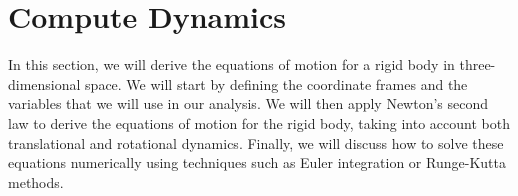 \section{Compute Dynamics}
    In this section, we will derive the equations of motion for a rigid body in three-dimensional space. We will start by defining the coordinate frames and the variables that we will use in our analysis. We will then apply Newton's second law to derive the equations of motion for the rigid body, taking into account both translational and rotational dynamics. Finally, we will discuss how to solve these equations numerically using techniques such as Euler integration or Runge-Kutta methods.
    
